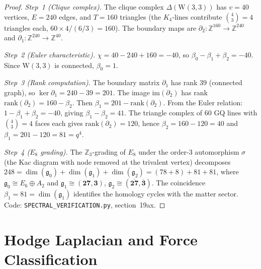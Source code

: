 \documentclass[12pt,a4paper]{article}
\newcommand{\W}{\mathrm{W}(3,3)}
\begin{document}
\begin{proof}
\emph{Step~1 (Clique complex).}
The clique complex $\Delta(\W)$ has $v = 40$ vertices,
$E = 240$ edges, and $T = 160$ triangles (the $K_4$-lines
contribute $\binom{4}{3} = 4$ triangles each, $60 \times 4 / (6/3) = 160$).
The boundary maps are $\partial_2\colon \mathbb{Z}^{160} \to \mathbb{Z}^{240}$
and $\partial_1\colon \mathbb{Z}^{240} \to \mathbb{Z}^{40}$.

\emph{Step~2 (Euler characteristic).}
$\chi = 40 - 240 + 160 = -40$, so
$\beta_0 - \beta_1 + \beta_2 = -40$.
Since $\W$ is connected, $\beta_0 = 1$.

\emph{Step~3 (Rank computation).}
The boundary matrix $\partial_1$ has rank $39$ (connected graph),
so $\ker\partial_1 = 240 - 39 = 201$.
The image $\mathrm{im}(\partial_2)$ has rank
$\mathrm{rank}(\partial_2) = 160 - \beta_2$.
Then $\beta_1 = 201 - \mathrm{rank}(\partial_2)$.
From the Euler relation: $1 - \beta_1 + \beta_2 = -40$, giving
$\beta_1 - \beta_2 = 41$.
The triangle complex of $60$ GQ lines with $\binom{4}{3}=4$ faces each
gives $\mathrm{rank}(\partial_2) = 120$, hence
$\beta_2 = 160 - 120 = 40$ and $\beta_1 = 201 - 120 = 81 = q^4$.

\emph{Step~4 ($E_8$ grading).}
The $\mathbb{Z}_3$-grading of $E_8$ under the order-$3$
automorphism $\sigma$ (the Kac diagram with node removed at
the trivalent vertex) decomposes
$248 = \dim(\mathfrak{g}_0) + \dim(\mathfrak{g}_1) + \dim(\mathfrak{g}_2)
= (78 + 8) + 81 + 81$,
where $\mathfrak{g}_0 \cong E_6 \oplus A_2$ and
$\mathfrak{g}_{1} \cong (\mathbf{27},\mathbf{3})$,
$\mathfrak{g}_{2} \cong (\overline{\mathbf{27}},\overline{\mathbf{3}})$.
The coincidence $\beta_1 = 81 = \dim(\mathfrak{g}_1)$ identifies
the homology cycles with the matter sector.
Code: \texttt{SPECTRAL\_VERIFICATION.py}, section~19ax.
\end{proof}

\section{Hodge Laplacian and Force Classification}
\label{sec:hodge}
\end{document}
